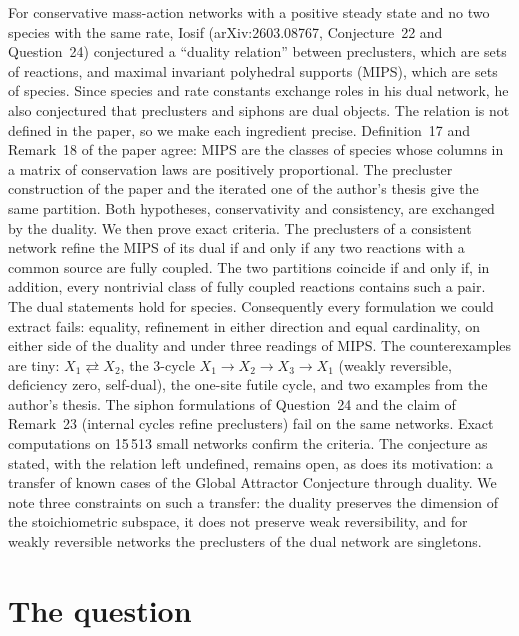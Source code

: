 \documentclass[11pt,a4paper]{report}
\begin{document}
\makepapertitle

\begin{paperabstract}
For conservative mass-action networks with a positive steady state and no two species with the same rate, Iosif
(arXiv:2603.08767, Conjecture~22 and Question~24) conjectured a ``duality relation'' between preclusters, which are
sets of reactions, and maximal invariant polyhedral supports (MIPS), which are sets of species. Since species and
rate constants exchange roles in his dual network, he also conjectured that preclusters and siphons are dual objects.
The relation is not defined in the paper, so we make each ingredient precise. Definition~17 and Remark~18 of the
paper agree: MIPS are the classes of species whose columns in a matrix of conservation laws are positively
proportional. The precluster construction of the paper and the iterated one of the author's thesis give the same
partition. Both hypotheses, conservativity and consistency, are exchanged by the duality. We then prove exact
criteria. The preclusters of a consistent network refine the MIPS of its dual if and only if any two reactions with a
common source are fully coupled. The two partitions coincide if and only if, in addition, every nontrivial class of
fully coupled reactions contains such a pair. The dual statements hold for species. Consequently every formulation
we could extract fails: equality, refinement in either direction and equal cardinality, on either side of the
duality and under three readings of MIPS. The counterexamples are tiny: \(X_1\rightleftarrows X_2\), the 3-cycle
\(X_1\to X_2\to X_3\to X_1\) (weakly reversible, deficiency zero, self-dual), the one-site futile cycle, and two
examples from the author's thesis. The siphon formulations of Question~24 and the claim of Remark~23 (internal cycles
refine preclusters) fail on the same networks. Exact computations on 15\,513 small networks confirm the criteria.
The conjecture as stated, with the relation left undefined, remains open, as does its motivation: a transfer of
known cases of the Global Attractor Conjecture through duality. We note three constraints on such a transfer: the
duality preserves the dimension of the stoichiometric subspace, it does not preserve weak reversibility, and for
weakly reversible networks the preclusters of the dual network are singletons.
\end{paperabstract}

\section*{The question}
\end{document}

